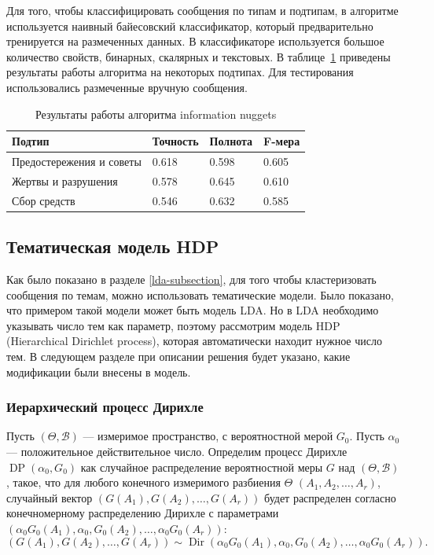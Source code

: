 \documentclass[12pt, a4paper]{article}
\DeclareMathOperator{\Dir}{Dir}
\DeclareMathOperator{\DP}{DP}
\begin{document}
	Для того, чтобы классифицировать сообщения по типам и подтипам, в алгоритме используется наивный байесовский классификатор, который предварительно тренируется на размеченных данных. В классификаторе используется большое количество свойств, бинарных, скалярных и текстовых. В таблице~\ref{nuggets-table} приведены результаты работы алгоритма на некоторых подтипах. Для тестирования использовались размеченные вручную сообщения.
	\begin{table}[h]
	\centering
	\caption{Результаты работы алгоритма information nuggets}
	\begin{tabular}{ l l l l}
	Подтип & Точность & Полнота & F-мера \\ \hline
	Предостережения и советы & 0.618 & 0.598 & 0.605 \\ 
	Жертвы и разрушения & 0.578 & 0.645 & 0.610 \\ 
	Сбор средств & 0.546 & 0.632 & 0.585 \\ \hline
	\end{tabular}
	
	\label{nuggets-table}
	\end{table}
	
	\subsection{Тематическая модель HDP}
  Как было показано в разделе \ref{lda-subsection}, для того чтобы кластеризовать сообщения по темам, можно использовать тематические модели. Было показано, что примером такой модели может быть модель LDA. Но в LDA необходимо указывать число тем как параметр, поэтому рассмотрим модель HDP (Hierarchical Dirichlet process), которая автоматически находит нужное число тем. В следующем разделе при описании решения будет указано, какие модификации были внесены в модель.
  
	\subsubsection{Иерархический процесс Дирихле}
  Пусть $(\Theta, \mathcal{B})$ --- измеримое пространство, с вероятностной мерой $G_0$. Пусть $\alpha_0$ --- положительное действительное число. Определим процесс Дирихле $\DP(\alpha_0, G_0)$ как случайное распределение вероятностной меры $G$ над $(\Theta, \mathcal{B})$, такое, что для любого конечного измеримого разбиения $\Theta$ $(A_1, A_2, \ldots, A_r)$, случайный вектор $(G(A_1), G(A_2), \ldots, G(A_r))$ будет распределен согласно конечномерному распределению Дирихле с параметрами $(\alpha_0 G_0(A_1), \alpha_0, G_0(A_2), \ldots, \alpha_0 G_0 (A_r))$:
  \begin{equation}
  (G(A_1), G(A_2), \ldots, G(A_r)) \sim \Dir(\alpha_0 G_0(A_1), \alpha_0, G_0(A_2), \ldots, \alpha_0 G_0 (A_r)).
  \end{equation}
  
\end{document}
